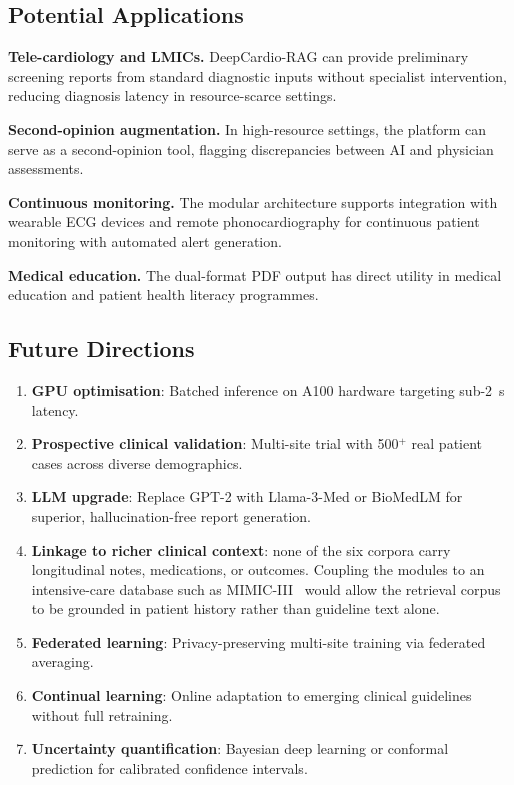 \documentclass[AMA,STIX1COL,]{WileyNJD-v2}
\begin{document}
\subsection{Potential Applications}

\textbf{Tele-cardiology and LMICs.} DeepCardio-RAG can provide
preliminary screening reports from standard diagnostic inputs without
specialist intervention, reducing diagnosis latency in resource-scarce
settings.

\textbf{Second-opinion augmentation.} In high-resource settings, the
platform can serve as a second-opinion tool, flagging discrepancies
between AI and physician assessments.

\textbf{Continuous monitoring.} The modular architecture supports
integration with wearable ECG devices and remote phonocardiography for
continuous patient monitoring with automated alert generation.

\textbf{Medical education.} The dual-format PDF output has direct
utility in medical education and patient health literacy programmes.

\subsection{Future Directions}

\begin{enumerate}
  \item \textbf{GPU optimisation}: Batched inference on A100 hardware
        targeting sub-2~s latency.
  \item \textbf{Prospective clinical validation}: Multi-site trial
        with 500$^+$ real patient cases across diverse demographics.
  \item \textbf{LLM upgrade}: Replace GPT-2 with Llama-3-Med or
        BioMedLM for superior, hallucination-free report generation.
  \item \textbf{Linkage to richer clinical context}: none of the six
        corpora carry longitudinal notes, medications, or outcomes.
        Coupling the modules to an intensive-care database such as
        MIMIC-III~\cite{johnson2016} would allow the retrieval corpus to
        be grounded in patient history rather than guideline text alone.
  \item \textbf{Federated learning}: Privacy-preserving multi-site
        training via federated averaging.
  \item \textbf{Continual learning}: Online adaptation to emerging
        clinical guidelines without full retraining.
  \item \textbf{Uncertainty quantification}: Bayesian deep learning or
        conformal prediction for calibrated confidence intervals.
\end{enumerate}
\end{document}
